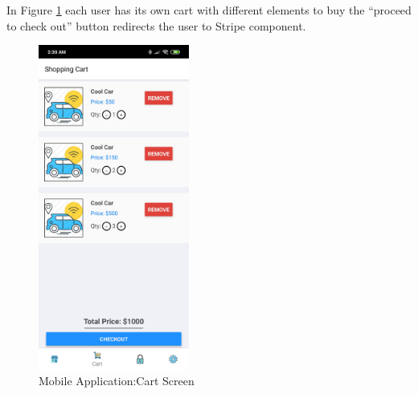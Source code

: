 In Figure \ref{fig: Mobile Application:Cart Screen} each user has its own cart with different elements to buy the “proceed to check out” button redirects the user to Stripe component.  
\newline
\begin{figure}[htp]%
    \center%
    \includegraphics[width=0.44\textwidth]{images/Software/cartmobile.png}%
    \caption[Mobile Application:Cart Screen]{Mobile Application:Cart Screen}\label{fig: Mobile Application:Cart Screen}%
  \end{figure}
  
  
  

